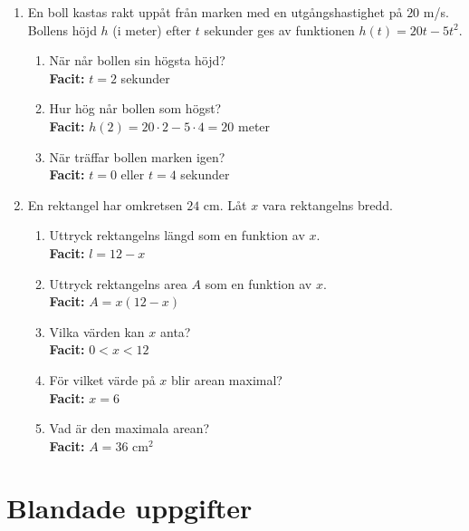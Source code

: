 \documentclass[a4paper,11pt]{article}
\begin{document}
\begin{enumerate}[label=\textbf{\arabic*.}]
    \item En boll kastas rakt uppåt från marken med en utgångshastighet på $20$ m/s. Bollens höjd $h$ (i meter) efter $t$ sekunder ges av funktionen $h(t) = 20t - 5t^2$. 
    \begin{enumerate}[label=\alph*)]
        \item När når bollen sin högsta höjd?
        \\ \textbf{Facit:} $t=2$ sekunder
        \item Hur hög når bollen som högst?
        \\ \textbf{Facit:} $h(2) = 20\cdot2 - 5\cdot4 = 20$ meter
        \item När träffar bollen marken igen?
        \\ \textbf{Facit:} $t=0$ eller $t=4$ sekunder
    \end{enumerate}
    
    \item En rektangel har omkretsen $24$ cm. Låt $x$ vara rektangelns bredd.
    \begin{enumerate}[label=\alph*)]
        \item Uttryck rektangelns längd som en funktion av $x$.
        \\ \textbf{Facit:} $l = 12-x$
        \item Uttryck rektangelns area $A$ som en funktion av $x$.
        \\ \textbf{Facit:} $A = x(12-x)$
        \item Vilka värden kan $x$ anta?
        \\ \textbf{Facit:} $0 < x < 12$
        \item För vilket värde på $x$ blir arean maximal?
        \\ \textbf{Facit:} $x=6$
        \item Vad är den maximala arean?
        \\ \textbf{Facit:} $A=36$ cm$^2$
    \end{enumerate}
\end{enumerate}

\section{Blandade uppgifter}
\end{document}
